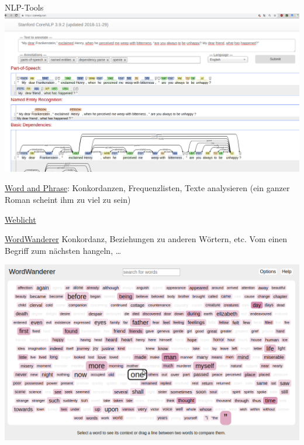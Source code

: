 \documentclass[10pt,a4paper]{article}
\begin{document}
\begin{multicols}{3}
\begin{textbox}{NLP-Tools}
\includegraphics[width=\textwidth]{frankenstein-corenlp.png}


\href{http://www.wordandphrase.info/}{Word and Phrase}: Konkordanzen, Frequenzlisten, Texte analysieren (ein ganzer Roman scheint ihm zu viel zu sein)

\href{https://weblicht.sfs.uni-tuebingen.de/weblicht/}{Weblicht}

\end{textbox}



\begin{textbox}{\href{http://wordwanderer.org/}{WordWanderer}}
Konkordanz, Beziehungen zu anderen Wörtern, etc. Vom einen Begriff zum nächsten hangeln, \dots

\includegraphics[width=\textwidth]{wordwanderer1.png}


\end{textbox}
\end{multicols}
\end{document}
